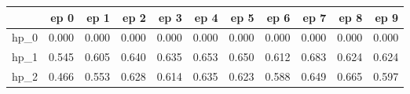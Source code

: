 \begin{tabular}{lrrrrrrrrrr}
\toprule
{} &   ep 0 &   ep 1 &   ep 2 &   ep 3 &   ep 4 &   ep 5 &   ep 6 &   ep 7 &   ep 8 &   ep 9 \\
\midrule
hp\_0 &  0.000 &  0.000 &  0.000 &  0.000 &  0.000 &  0.000 &  0.000 &  0.000 &  0.000 &  0.000 \\
hp\_1 &  0.545 &  0.605 &  0.640 &  0.635 &  0.653 &  0.650 &  0.612 &  0.683 &  0.624 &  0.624 \\
hp\_2 &  0.466 &  0.553 &  0.628 &  0.614 &  0.635 &  0.623 &  0.588 &  0.649 &  0.665 &  0.597 \\
\bottomrule
\end{tabular}
